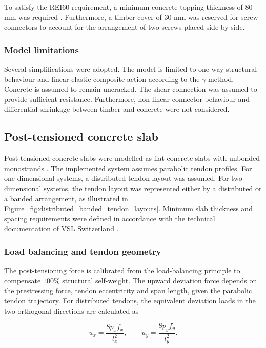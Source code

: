 To satisfy the REI60 requirement, a minimum concrete topping thickness of 80 mm was required \cite{SIA262_2025}. Furthermore, a timber cover of 30 mm was reserved for screw connectors to account for the arrangement of two screws placed side by side.

\subsubsection{Model limitations}

Several simplifications were adopted. The model is limited to one-way structural behaviour and linear-elastic composite action according to the $\gamma$-method. Concrete is assumed to remain uncracked. The shear connection was assumed to provide sufficient resistance. Furthermore, non-linear connector behaviour and differential shrinkage between timber and concrete were not considered.

\subsection{Post-tensioned concrete slab}

Post-tensioned concrete slabs were modelled as flat concrete slabs with unbonded monostrands \cite{Rombach2010, flachdecken_Morgen}. The implemented system assumes parabolic tendon profiles. For one-dimensional systems, a distributed tendon layout was assumed. For two-dimensional systems, the tendon layout was represented either by a distributed or a banded arrangement, as illustrated in Figure~\ref{fig:distributed_banded_tendon_layouts}. Minimum slab thickness and spacing requirements were defined in accordance with the technical documentation of VSL Switzerland \cite{VSL_STA01007}.

\subsubsection{Load balancing and tendon geometry}

The post-tensioning force is calibrated from the load-balancing principle to compensate $100\%$ structural self-weight.  The upward deviation force depends on the prestressing force, tendon eccentricity and span length, given the parabolic tendon trajectory. For distributed tendons, the equivalent deviation loads in the two orthogonal directions are calculated as

\begin{equation}
u_x
=
\frac{8p_x f_x}{l_x^2},
\qquad
u_y
=
\frac{8p_y f_y}{l_y^2}.
\end{equation}

